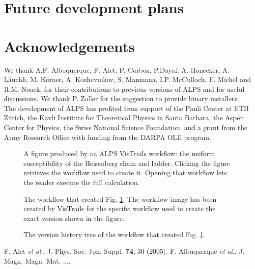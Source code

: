 \documentclass[12pt]{iopart}
\begin{document}
\section{Future development plans}
\section{Acknowledgements}

We thank A.F. Albuquerque, F. Alet, P. Corboz, P.Dayal, A. Honecker, A. L\"auchli, M. K\"orner,  A. Kozhevnikov, S. Manmana, I.P. McCulloch, F. Michel and R.M. Noack, for their contributions to previous versions of ALPS and  for useful discussions. We thank P. Zoller for the suggestion to provide binary installers. The development of ALPS has profited from support of the Pauli Center at ETH Z\"urich, the Kavli Institute for Theoretical Physics in Santa Barbara, the Aspen Center for Physics, the Swiss National Science Foundation, and a grant from the Army Research Office with funding from the DARPA OLE program.

\begin{figure}
\begin{center}

\caption{A figure produced by an ALPS VisTrails workflow: the uniform susceptibility of the Heisenberg chain and ladder. Clicking the figure retrieves the workflow used to create it. Opening that workflow lets the reader execute the full calculation.}
\label{figure}
\end{center}
\end{figure}


\begin{figure}
\begin{center}
\caption{The workflow that created Fig. \ref{figure}. The workflow image has been created by VisTrails for the specific workflow used to create the exact version shown in the figure.}
\label{workflow}
\end{center}
\end{figure}



\begin{figure}
\begin{center}
\caption{The version history tree of the workflow that created Fig. \ref{figure}.}
\end{center}
\end{figure}




\begin{thebibliography}{99} 
 F. Alet {\it et al.},  J. Phys. Soc. Jpn. Suppl. {\bf 74}, 30 (2005).
 F. Albuquerque {\it et al.}, J. Magn. Magn. Mat. ....


\end{thebibliography}
\end{document}
